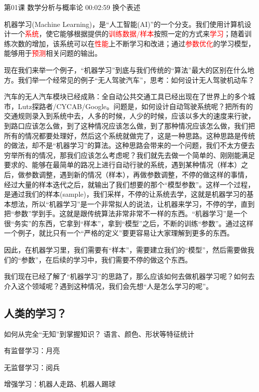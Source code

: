 \documentclass[UTF8]{ctexart}
\begin{document}
第01课 数学分析与概率论 00:02:59 换个表述

机器学习(Machine Learning)，是“人工智能(AI)”的一个分支。我们使用计算机设计一个\textcolor{red}{系统}，使它能够根据提供的\textcolor{red}{训练数据/样本}按照一定的方式来\textcolor{red}{学习}；随着训练次数的增加，该系统可以在\textcolor{red}{性能}上不断学习和改进；通过\textcolor{red}{参数优化}的学习模型，能够用于\textcolor{red}{预测}相关问题的输出。

现在我们来举一个例子，“机器学习”到底与我们传统的“算法”最大的区别在什么地方。我们举一个经常见的例子“无人驾驶汽车”，思考：如何设计无人驾驶机动车？

汽车的无人汽车模块已经成熟：全自动公共交通工具已经出现在了世界上的多个城市，Lutz探路者/CYCAB/Google。问题是，如何设计自动驾驶系统呢？把所有的交通规则录入到系统中去，人多的时候，人少的时候，应该以多大的速度来行驶，到路口应该怎么做，到了这种情况应该怎么做，到了那种情况应该怎么做，我们把所有的情况都要处理好，然后这个系统就做完了，这是一种思路。这种思路是传统的做法，却不是“机器学习”的算法。这种思路会带来的一个问题，我们不太方便去穷举所有的情况，那我们应该怎么考虑呢？我们就先去做一个简单的、刚刚能满足要求的、能够在最简单的路况上进行自动行驶的系统，遇到某种情况（样本）之后，做参数调整，遇到新的情况（样本），再做参数调整，不停的做这样的事情，经过大量的样本迭代之后，就输出了我们想要的那个“模型参数”。这样一个过程，是通过我们的样本(sample)，我们采样，不停的让系统去学，这就是机器学习的基本想法，所以“机器学习”是一个非常拟人的说法，让机器来学习，不停的学，直到把“参数”学到手。这就是跟传统算法非常非常不一样的东西。“机器学习”是一个很“务实”的东西，它拿到“样本”，拿到“模型”之后，不断的训练“参数”。通过这样一个例子，就比只有一个“严格的定义”要更容易让大家理解到更多的东西。

因此，在机器学习里，我们需要有“样本”，需要建立我们的“模型”，然后需要做我们的“参数”，在后续的学习中，我们需要不停的做这个东西。

我们现在已经了解了“机器学习”的思路了，那么应该如何去做机器学习呢？如何去介入这个领域呢？遇到这种情况，我们会先想“人是怎么学习的呢”。

\subsection{人类的学习？}

如何从完全“无知”到掌握知识？ 语言、颜色、形状等特征统计

有监督学习：月亮

无监督学习：阅兵

增强学习：机器人走路、机器人踢球
\end{document}
